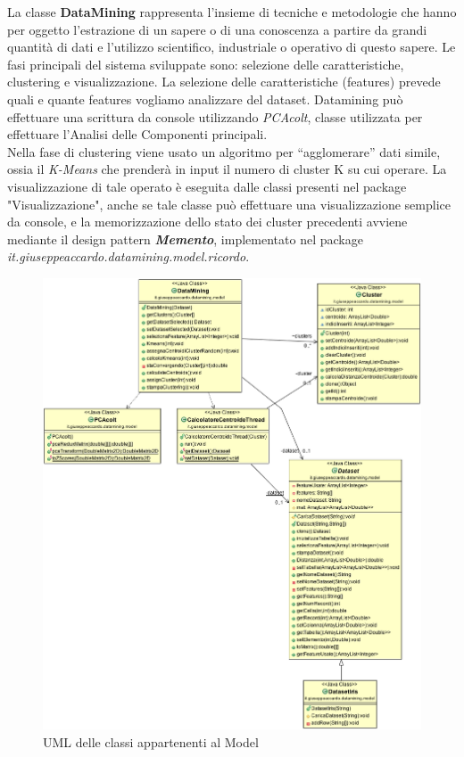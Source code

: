 \documentclass[a4paper, oneside]{book}
\begin{document}
\begin{itemize}
La classe \textbf{DataMining} rappresenta l'insieme di tecniche e metodologie che hanno per oggetto l'estrazione di un sapere o di una conoscenza a partire da grandi quantità di dati e l'utilizzo scientifico, industriale o operativo di questo sapere. Le fasi principali del sistema sviluppate sono: selezione delle caratteristiche, clustering e visualizzazione. 
La selezione delle caratteristiche (features) prevede quali e quante features vogliamo analizzare del dataset. Datamining può effettuare una scrittura da console utilizzando \textit{PCAcolt}, classe utilizzata per effettuare l'Analisi delle Componenti principali. \\
Nella fase di clustering viene usato un algoritmo per “agglomerare” dati simile, ossia il \textit{K-Means} che prenderà in input il numero di cluster K su cui operare. La visualizzazione di tale operato è eseguita dalle classi presenti nel package "Visualizzazione", anche se tale classe può effettuare una visualizzazione semplice da console, e la memorizzazione dello stato dei cluster precedenti avviene mediante il design pattern \textit{\textbf{Memento}}, implementato nel package \textit{it.giuseppeaccardo.datamining.model.ricordo}.

  \begin{figure}[htp]
\centering
\includegraphics[width=12cm]{umlModel.png}
\caption{UML delle classi appartenenti al Model}
\label{fig:uml model}
\end{figure}



\end{itemize}
\end{document}
